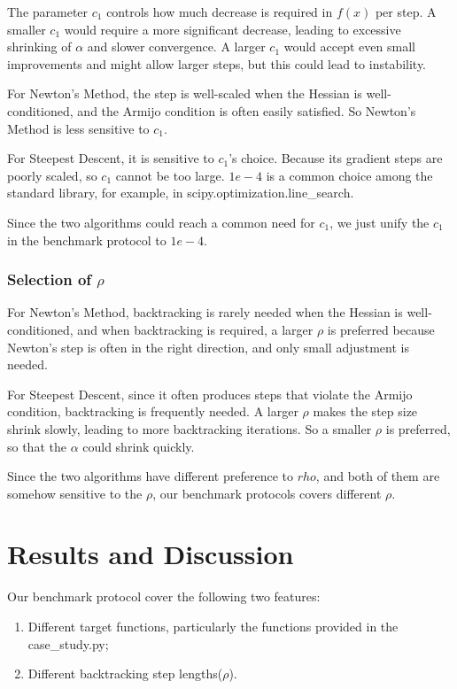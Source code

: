 \documentclass[12pt]{article}
\begin{document}
The parameter $c_1$ controls how much decrease is required in $f(x)$ per step. A smaller $c_1$  would require a more significant decrease, leading to excessive shrinking of $\alpha$ and slower convergence. A larger $c_1$ would accept even small improvements and might allow larger steps, but this could lead to instability.

For Newton's Method, the step is well-scaled when the Hessian is well-conditioned, and the Armijo condition is often easily satisfied. So Newton's Method is less sensitive to $c_1$.

For Steepest Descent, it is sensitive to $c_1$'s choice. Because its gradient steps are poorly scaled, so $c_1$ cannot be too large. $1e-4$ is a common choice among the standard library, for example, in scipy.optimization.line\_search. 

Since the two algorithms could reach a common need for $c_1$, we just unify the $c_1$ in the benchmark protocol to $1e-4$.

\subsubsection{Selection of $\rho$}

For Newton's Method, backtracking is rarely needed when the Hessian is well-conditioned, and when backtracking is required, a larger $\rho$ is preferred because Newton's step is often in the right direction, and only small adjustment is needed.

For Steepest Descent, since it often produces steps that violate the Armijo condition, backtracking is frequently needed. A larger $\rho$ makes the step size shrink slowly, leading to more backtracking iterations. So a smaller $\rho$ is preferred, so that the $\alpha$ could shrink quickly.

Since the two algorithms have different preference to $rho$, and both of them are somehow sensitive to the $\rho$, our benchmark protocols covers different $\rho$. 

\section{Results and Discussion}

Our benchmark protocol cover the following two features: 

\begin{enumerate}
  \item Different target functions, particularly the functions provided in the case\_study.py;
  \item Different backtracking step lengths($\rho$).
\end{enumerate}
\end{document}
